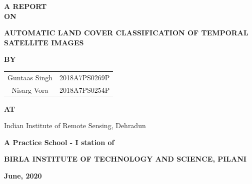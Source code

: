 \documentclass[12pt, a4paper]{report}
\begin{document}
\pagestyle{empty}
\begin{titlepage}
\begin{doublespace}
\vspace*{0.2cm}
\begin{center} \textbf{A REPORT\\ON} \end{center}
\begin{center} \textbf{{\Large AUTOMATIC LAND COVER CLASSIFICATION OF TEMPORAL SATELLITE IMAGES}} \end{center}
\begin{center} \textbf{BY} \end{center}
\begin{center} 
{\Large 
	\begin{tabular}{c c}
	Guntaas Singh & 2018A7PS0269P\\
	Nisarg Vora & 2018A7PS0254P
	\end{tabular}
}
\end{center}
\vspace{6cm}
\begin{center} \textbf{AT} \end{center}
\begin{center} {\Large Indian Institute of Remote Sensing, Dehradun} \end{center}
\begin{center} \textbf{A Practice School - I station of} \end{center}
\begin{center} {\textbf{BIRLA INSTITUTE OF TECHNOLOGY AND SCIENCE, PILANI}} \end{center}
\begin{center} \textbf{June, 2020} \end{center}
\end{doublespace}
\end{titlepage}
\pagebreak
\end{document}
